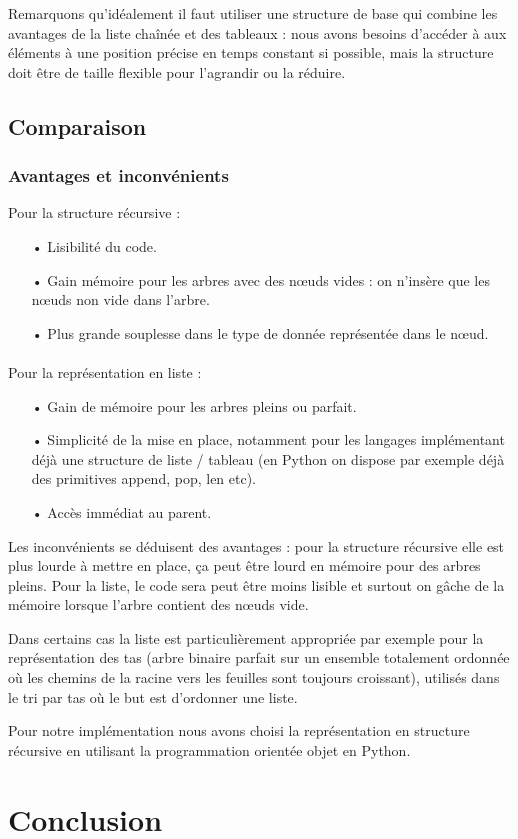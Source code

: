 \documentclass{report}
\begin{document}
Remarquons qu'idéalement il faut utiliser une structure de base qui combine les avantages de la liste chaînée et des tableaux : nous avons besoins d'accéder à aux éléments à une position précise en temps constant si possible, mais la structure doit être de taille flexible pour l'agrandir ou la réduire. 

\subsection{Comparaison}
\subsubsection{Avantages et inconvénients}
Pour la structure récursive :
\begin{itemize}
\item[•]
Lisibilité du code.
\item[•]
Gain mémoire pour les arbres avec des nœuds vides : on n'insère que les nœuds non vide dans l'arbre.
\item[•]
Plus grande souplesse dans le type de donnée représentée dans le nœud.
\end{itemize}
\paragraph*{}
Pour la représentation en liste :
\begin{itemize}
\item[•]
Gain de mémoire pour les arbres pleins ou parfait.
\item[•]
Simplicité de la mise en place, notamment pour les langages implémentant déjà une structure de liste / tableau (en Python on dispose par exemple déjà des primitives append, pop, len etc).
\item[•]
Accès immédiat au parent.
\end{itemize}
Les inconvénients se déduisent des avantages : pour la structure récursive elle est plus lourde à mettre en place, ça peut être lourd en mémoire pour des arbres pleins.
Pour la liste, le code sera peut être moins lisible et surtout on gâche de la mémoire lorsque l'arbre contient des nœuds vide. 

Dans certains cas la liste est particulièrement appropriée par exemple pour la représentation des tas (arbre binaire parfait sur un ensemble totalement ordonnée où les chemins de la racine vers les feuilles sont toujours croissant), utilisés dans le tri par tas où le but est d'ordonner une liste. 

Pour notre implémentation nous avons choisi la représentation en structure récursive en utilisant la programmation orientée objet en Python.

\section{Conclusion}

\nocite{*}


\end{document}
